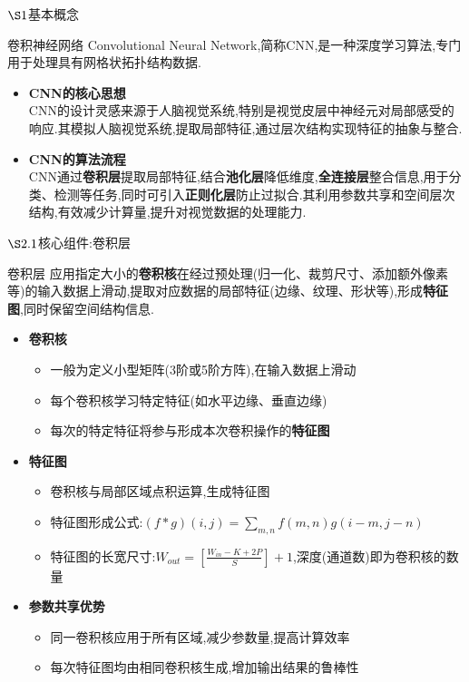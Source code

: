 \documentclass{beamer}
\begin{document}
\begin{frame}{$\S1$基本概念}
    \begin{block}{卷积神经网络}
        Convolutional Neural Network,简称CNN,是一种深度学习算法,专门用于处理具有网格状拓扑结构数据.
    \end{block}
    \begin{itemize}
        \item \textbf{CNN的核心思想}
        \\CNN的设计灵感来源于人脑视觉系统,特别是视觉皮层中神经元对局部感受的响应.其模拟人脑视觉系统,提取局部特征,通过层次结构实现特征的抽象与整合.
        \item \textbf{CNN的算法流程}
        \\CNN通过\textbf{卷积层}提取局部特征,结合\textbf{池化层}降低维度,\textbf{全连接层}整合信息,用于分类、检测等任务,同时可引入\textbf{正则化层}防止过拟合.其利用参数共享和空间层次结构,有效减少计算量,提升对视觉数据的处理能力.
    \end{itemize}
\end{frame}

\begin{frame}{$\S2.1$核心组件:卷积层}
    \begin{block}{卷积层}
        应用指定大小的\textbf{卷积核}在经过预处理(归一化、裁剪尺寸、添加额外像素等)的输入数据上滑动,提取对应数据的局部特征(边缘、纹理、形状等),形成\textbf{特征图},同时保留空间结构信息.
    \end{block}
    \begin{itemize}
      \item \textbf{卷积核}
        \begin{itemize}
          \item 一般为定义小型矩阵(3阶或5阶方阵),在输入数据上滑动
          \item 每个卷积核学习特定特征(如水平边缘、垂直边缘)
          \item 每次的特定特征将参与形成本次卷积操作的\textbf{特征图}
        \end{itemize}
      \item \textbf{特征图}
        \begin{itemize}
          \item 卷积核与局部区域点积运算,生成特征图
          \item 特征图形成公式:$(f*g)(i,j)=\sum\limits_{m,n}f(m,n)g(i-m,j-n)$
          \item 特征图的长宽尺寸:$W_{out}=[\frac{W_{in}-K+2P}{S}]+1$,深度(通道数)即为卷积核的数量
        \end{itemize}
      \item \textbf{参数共享优势}
        \begin{itemize}
          \item 同一卷积核应用于所有区域,减少参数量,提高计算效率
          \item 每次特征图均由相同卷积核生成,增加输出结果的鲁棒性
        \end{itemize}
    \end{itemize}
\end{frame}
\end{document}
